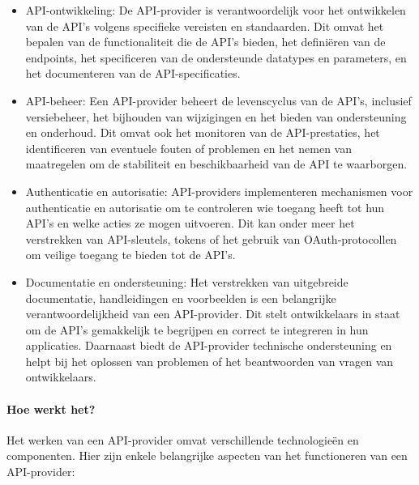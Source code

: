 \begin{itemize}
    \item API-ontwikkeling: De API-provider is verantwoordelijk voor het ontwikkelen van de API's volgens specifieke vereisten en standaarden. Dit omvat het bepalen van de functionaliteit die de API's bieden, het definiëren van de endpoints, het specificeren van de ondersteunde datatypes en parameters, en het documenteren van de API-specificaties.
    \item API-beheer: Een API-provider beheert de levenscyclus van de API's, inclusief versiebeheer, het bijhouden van wijzigingen en het bieden van ondersteuning en onderhoud. Dit omvat ook het monitoren van de API-prestaties, het identificeren van eventuele fouten of problemen en het nemen van maatregelen om de stabiliteit en beschikbaarheid van de API te waarborgen.
    \item Authenticatie en autorisatie: API-providers implementeren mechanismen voor authenticatie en autorisatie om te controleren wie toegang heeft tot hun API's en welke acties ze mogen uitvoeren. Dit kan onder meer het verstrekken van API-sleutels, tokens of het gebruik van OAuth-protocollen om veilige toegang te bieden tot de API's.
    \item Documentatie en ondersteuning: Het verstrekken van uitgebreide documentatie, handleidingen en voorbeelden is een belangrijke verantwoordelijkheid van een API-provider. Dit stelt ontwikkelaars in staat om de API's gemakkelijk te begrijpen en correct te integreren in hun applicaties. Daarnaast biedt de API-provider technische ondersteuning en helpt bij het oplossen van problemen of het beantwoorden van vragen van ontwikkelaars.
\end{itemize} \autocite{Cleo2023}

\paragraph{Hoe werkt het?}
Het werken van een API-provider omvat verschillende technologieën en componenten. Hier zijn enkele belangrijke aspecten van het functioneren van een API-provider:

